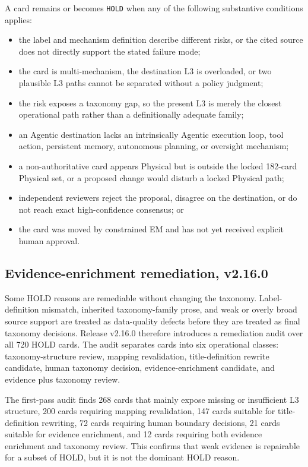 \documentclass[11pt,a4paper]{article}
\newcommand{\code}[1]{\texttt{#1}}
\begin{document}
A card remains or becomes \code{HOLD} when any of the following substantive
conditions applies:
\begin{itemize}[leftmargin=2em]
  \item the label and mechanism definition describe different risks, or the
  cited source does not directly support the stated failure mode;
  \item the card is multi-mechanism, the destination L3 is overloaded, or two
  plausible L3 paths cannot be separated without a policy judgment;
  \item the risk exposes a taxonomy gap, so the present L3 is merely the closest
  operational path rather than a definitionally adequate family;
  \item an Agentic destination lacks an intrinsically Agentic execution loop,
  tool action, persistent memory, autonomous planning, or oversight mechanism;
  \item a non-authoritative card appears Physical but is outside the locked
  182-card Physical set, or a proposed change would disturb a locked Physical
  path;
  \item independent reviewers reject the proposal, disagree on the destination,
  or do not reach exact high-confidence consensus; or
  \item the card was moved by constrained EM and has not yet received explicit
  human approval.
\end{itemize}

\subsection{Evidence-enrichment remediation, v2.16.0}

Some HOLD reasons are remediable without changing the taxonomy. Label-definition
mismatch, inherited taxonomy-family prose, and weak or overly broad source
support are treated as data-quality defects before they are treated as final
taxonomy decisions. Release v2.16.0 therefore introduces a remediation audit
over all 720 HOLD cards. The audit separates cards into six operational
classes: taxonomy-structure review, mapping revalidation, title-definition
rewrite candidate, human taxonomy decision, evidence-enrichment candidate, and
evidence plus taxonomy review.

The first-pass audit finds 268 cards that mainly expose missing or insufficient
L3 structure, 200 cards requiring mapping revalidation, 147 cards suitable for
title-definition rewriting, 72 cards requiring human boundary decisions, 21
cards suitable for evidence enrichment, and 12 cards requiring both evidence
enrichment and taxonomy review. This confirms that weak evidence is repairable
for a subset of HOLD, but it is not the dominant HOLD reason.
\end{document}
